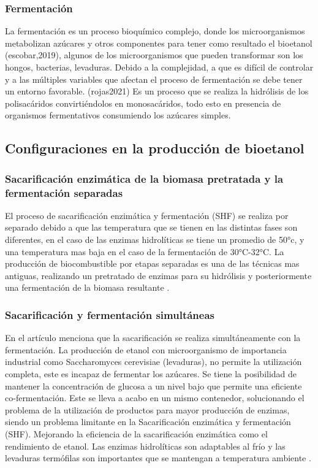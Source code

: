 \documentclass[12pt]{article}
\begin{document}
		
		
		\subsubsection{Fermentación}
		La fermentación es un proceso bioquímico complejo, donde los microorganismos metabolizan azúcares y otros componentes para tener como resultado el bioetanol (escobar,2019), algunos de los microorganismos que pueden transformar son los hongos, bacterias, levaduras. Debido a la complejidad, a que es difícil de controlar y a las múltiples variables que afectan el proceso de fermentación se debe tener un entorno favorable. (rojas2021)
		Es un proceso que se realiza la hidrólisis de los polisacáridos convirtiéndolos en monosacáridos, todo esto en presencia de organismos fermentativos consumiendo los azúcares simples.
		
		
		
		
		\subsection{Configuraciones en la producción de bioetanol}	
		\subsubsection{Sacarificación enzimática de la biomasa pretratada y la fermentación separadas}
		
		El proceso de sacarificación enzimática y fermentación (SHF) se realiza por separado debido a que las temperatura que se tienen en las distintas fases son diferentes, en el caso de las enzimas hidrolíticas se tiene un promedio de 50°c, y una temperatura mas baja en el caso de la fermentación de 30°C-32°C. 
		La producción de biocombustible por etapas separadas es una de las técnicas mas antiguas, realizando un pretratado de enzimas para su hidrólisis y posteriormente una fermentación de la biomasa resultante  \cite{CHOUDHARY201682}.
		
		
		
		
		\subsubsection{Sacarificación y fermentación simultáneas}
		
		En el artículo \cite{CHOUDHARY201682} menciona que la sacarificación se realiza simultáneamente con la fermentación.
		La producción de etanol con microorganismo de importancia industrial como Saccharomyces cerevisiae (levaduras), no permite la utilización completa, este es incapaz de fermentar los azúcares. Se tiene la posibilidad de mantener la concentración de glucosa a un nivel bajo que permite una eficiente co-fermentación.
		Este se lleva a acabo en un mismo contenedor, solucionando el problema de la utilización de productos para mayor producción de enzimas, siendo un problema limitante en la Sacarificación enzimática y fermentación (SHF). Mejorando la eficiencia de la sacarificación enzimática como el rendimiento de etanol. 
		Las enzimas hidrolíticas son adaptables al frío y las levaduras termófilas son importantes que se mantengan a temperatura ambiente \cite{CHOUDHARY201682}.
		
\end{document}
